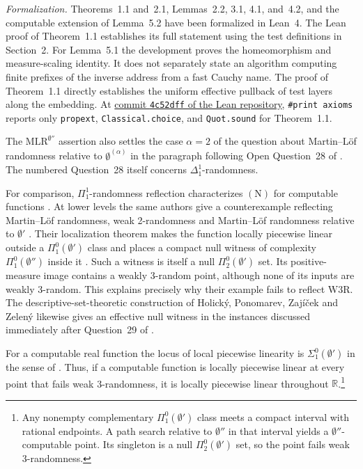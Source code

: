 \documentclass[12pt,reqno]{amsart}
\newcommand{\WThree}{\mathrm{W3R}}
\newcommand{\MLR}{\mathrm{MLR}}
\newcommand{\Nprop}{\mathrm{(N)}}
\newcommand{\RR}{\mathbb R}
\newcommand{\jump}{\emptyset'}
\newcommand{\djump}{\emptyset''}
\begin{document}
\noindent\textit{Formalization.} Theorems~1.1 and~2.1, Lemmas~2.2, 3.1, 4.1,
and~4.2, and the computable extension of Lemma~5.2 have been formalized in
Lean~4. The Lean proof of Theorem~1.1 establishes its full statement using
the test definitions in Section~2. For Lemma~5.1 the development proves the
homeomorphism and measure-scaling identity. It does not separately state
an algorithm computing finite prefixes of the inverse address from a fast
Cauchy name. The proof of Theorem~1.1 directly establishes the uniform
effective pullback of test layers along the embedding.
At \href{https://github.com/FAlepher/Weak_3_Randomness_and_Luzin_N/tree/4c52dff0973a7c2d9239bfe6c534c9066283b390}{commit \texttt{4c52dff} of the Lean repository},
\texttt{\#print axioms} reports only \texttt{propext},
\texttt{Classical.choice}, and \texttt{Quot.sound} for Theorem~1.1.

The $\MLR^{\djump}$ assertion also settles the case $\alpha=2$ of the
question about Martin--L\"of randomness relative to $\emptyset^{(\alpha)}$
in the paragraph following Open Question~28 of \cite{PWY}. The numbered
Question~28 itself concerns $\Delta^1_1$-randomness.

For comparison, $\Pi^1_1$-randomness reflection characterizes $\Nprop$
for computable functions \cite{PWY}. At lower levels the same authors
give a counterexample reflecting Martin--L\"of randomness, weak
2-randomness and Martin--L\"of randomness relative to $\jump$
\cite[Corollary~31]{PWY}. Their localization theorem makes the function
locally piecewise linear outside a $\Pi^0_1(\jump)$ class and places a
compact null witness of complexity $\Pi^0_1(\djump)$ inside it
\cite[Theorem~30]{PWY}. Such a witness is itself a null $\Pi^0_2(\jump)$
set. Its positive-measure image contains a weakly 3-random point, although
none of its inputs are weakly 3-random. This explains precisely why their
example fails to reflect $\WThree$. The descriptive-set-theoretic
construction of Holick\'y, Ponomarev, Zaj\'i\v cek and Zelen\'y
\cite{HPZZ} likewise gives an effective null witness in the instances
discussed immediately after Question~29 of \cite{PWY}.


For a computable real function the locus of local piecewise linearity
is $\Sigma^0_1(\jump)$ in the sense of \cite[Proposition~32]{PWY}.
Thus, if a computable function is locally piecewise linear at every
point that fails weak 3-randomness, it is locally piecewise linear
throughout $\RR$.\footnote{Any nonempty complementary
$\Pi^0_1(\jump)$ class meets a compact
interval with rational endpoints. A path search relative to $\djump$
in that interval yields a $\djump$-computable point.
Its singleton is a null $\Pi^0_2(\jump)$ set, so the point fails
weak 3-randomness.}
\end{document}
